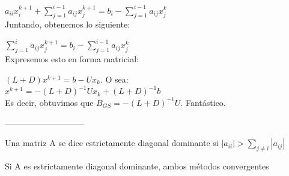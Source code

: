 \documentclass[10pt,a4paper,final]{report}
\begin{document}
$a_{ii} x_i^{k+1} + \sum_{j=1}^{i-1}a_{ij}x_j^{k+1} =  b_i - \sum_{j=1}^{i-1} a_{ij} x_j^{k}$\\

Juntando, obtenemos lo siguiente:

$\sum_{j=1}^{i}a_{ij}x_j^{k+1} =  b_i - \sum_{j=1}^{i-1} a_{ij} x_j^{k}$\\

Expresemos esto en forma matricial:

$(L+D) x^{k+1} = b - U x_k$. O sea:\\

$x^{k+1} = - (L+D)^{-1} U x_k + (L+D)^{-1} b$\\

Es decir, obtuvimos que $B_{GS} = - (L+D)^{-1} U$. Fantástico.

-----------------------------


\begin{definition}Una matriz A se dice estrictamente diagonal dominante si $|a_{ii}| > \sum_{j\neq i} |a_{ij}|$
\end{definition}

\begin{theorem}Si A es estrictamente diagonal dominante, ambos métodos convergentes
\end{theorem}
\end{document}
